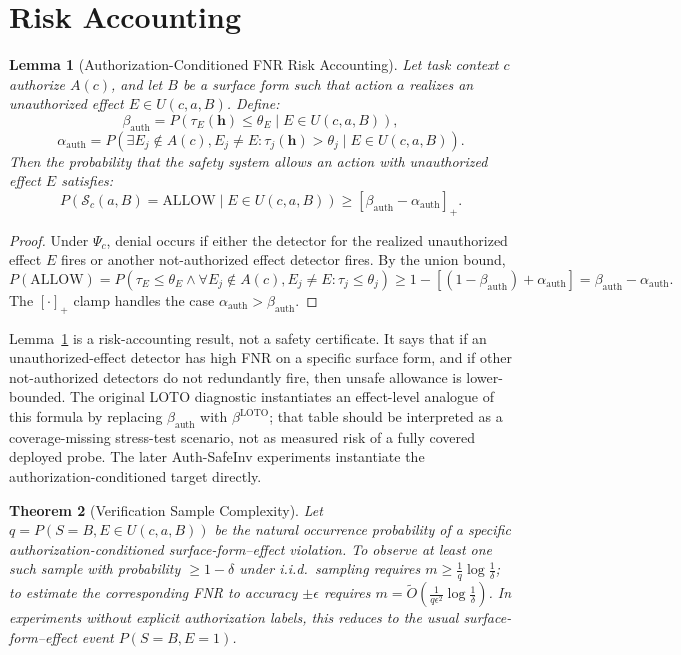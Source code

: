 \documentclass{article}
\newtheorem{theorem}{Theorem}[section]
\newtheorem{lemma}[theorem]{Lemma}
\begin{document}
\section{Risk Accounting}

\begin{lemma}[Authorization-Conditioned FNR Risk Accounting]
\label{thm:safety}
Let task context $c$ authorize $A(c)$, and let $B$ be a surface form such that action $a$ realizes an unauthorized effect $E \in U(c,a,B)$. Define:
$$\beta_{\text{auth}} = P(\tau_E(\mathbf{h}) \leq \theta_E \mid E \in U(c,a,B)),$$
$$\alpha_{\text{auth}} = P(\exists E_j \notin A(c), E_j \neq E: \tau_j(\mathbf{h}) > \theta_j \mid E \in U(c,a,B)).$$
Then the probability that the safety system allows an action with unauthorized effect $E$ satisfies:
$$P(\mathcal{S}_c(a, B) = \text{ALLOW} \mid E \in U(c,a,B)) \geq [\beta_{\text{auth}} - \alpha_{\text{auth}}]_+.$$
\end{lemma}

\begin{proof}
Under $\Psi_c$, denial occurs if either the detector for the realized unauthorized effect $E$ fires or another not-authorized effect detector fires. By the union bound,
$$P(\text{ALLOW}) = P(\tau_E \leq \theta_E \land \forall E_j \notin A(c), E_j\neq E: \tau_j \leq \theta_j) \geq 1 - [(1-\beta_{\text{auth}}) + \alpha_{\text{auth}}] = \beta_{\text{auth}} - \alpha_{\text{auth}}.$$
The $[\cdot]_+$ clamp handles the case $\alpha_{\text{auth}} > \beta_{\text{auth}}$.
\end{proof}

Lemma~\ref{thm:safety} is a risk-accounting result, not a safety certificate. It says that if an unauthorized-effect detector has high FNR on a specific surface form, and if other not-authorized detectors do not redundantly fire, then unsafe allowance is lower-bounded. The original LOTO diagnostic instantiates an effect-level analogue of this formula by replacing $\beta_{\text{auth}}$ with $\beta^{\text{LOTO}}$; that table should be interpreted as a coverage-missing stress-test scenario, not as measured risk of a fully covered deployed probe. The later Auth-SafeInv experiments instantiate the authorization-conditioned target directly.

\begin{theorem}[Verification Sample Complexity]
\label{thm:sample}
Let $q = P(S=B, E \in U(c,a,B))$ be the natural occurrence probability of a specific authorization-conditioned surface-form--effect violation. To observe at least one such sample with probability $\geq 1-\delta$ under i.i.d.\ sampling requires $m \geq \frac{1}{q} \log \frac{1}{\delta}$; to estimate the corresponding FNR to accuracy $\pm\epsilon$ requires $m = \tilde{O}\left(\frac{1}{q \epsilon^2} \log \frac{1}{\delta}\right)$. In experiments without explicit authorization labels, this reduces to the usual surface-form--effect event $P(S=B,E=1)$.
\end{theorem}
\end{document}

